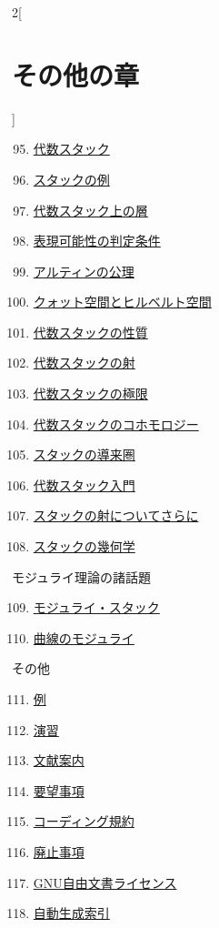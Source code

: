 \begin{multicols}{2}[\section{その他の章}]
\begin{enumerate}
\setcounter{enumi}{94}
\item \hyperref[algebraic-section-phantom]{代数スタック}
\item \hyperref[examples-stacks-section-phantom]{スタックの例}
\item \hyperref[stacks-sheaves-section-phantom]{代数スタック上の層}
\item \hyperref[criteria-section-phantom]{表現可能性の判定条件}
\item \hyperref[artin-section-phantom]{アルティンの公理}
\item \hyperref[quot-section-phantom]{クォット空間とヒルベルト空間}
\item \hyperref[stacks-properties-section-phantom]{代数スタックの性質}
\item \hyperref[stacks-morphisms-section-phantom]{代数スタックの射}
\item \hyperref[stacks-limits-section-phantom]{代数スタックの極限}
\item \hyperref[stacks-cohomology-section-phantom]{代数スタックのコホモロジー}
\item \hyperref[stacks-perfect-section-phantom]{スタックの導来圏}
\item \hyperref[stacks-introduction-section-phantom]{代数スタック入門}
\item \hyperref[stacks-more-morphisms-section-phantom]{スタックの射についてさらに}
\item \hyperref[stacks-geometry-section-phantom]{スタックの幾何学}
\end{enumerate}
モジュライ理論の諸話題
\begin{enumerate}
\setcounter{enumi}{108}
\item \hyperref[moduli-section-phantom]{モジュライ・スタック}
\item \hyperref[moduli-curves-section-phantom]{曲線のモジュライ}
\end{enumerate}
その他
\begin{enumerate}
\setcounter{enumi}{110}
\item \hyperref[examples-section-phantom]{例}
\item \hyperref[exercises-section-phantom]{演習}
\item \hyperref[guide-section-phantom]{文献案内}
\item \hyperref[desirables-section-phantom]{要望事項}
\item \hyperref[coding-section-phantom]{コーディング規約}
\item \hyperref[obsolete-section-phantom]{廃止事項}
\item \hyperref[fdl-section-phantom]{GNU自由文書ライセンス}
\item \hyperref[index-section-phantom]{自動生成索引}
\end{enumerate}
\end{multicols}
